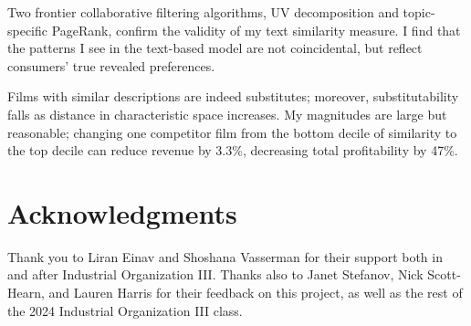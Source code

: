 \documentclass{article}
\begin{document}
Two frontier collaborative filtering algorithms, UV decomposition and topic-specific PageRank, confirm the validity of my text similarity measure. I find that the patterns I see in the text-based model are not coincidental, but reflect consumers' true revealed preferences.

Films with similar descriptions are indeed substitutes; moreover, substitutability falls as distance in characteristic space increases. My magnitudes are large but reasonable; changing one competitor film from the bottom decile of similarity to the top decile can reduce revenue by 3.3\%, decreasing total profitability by 47\%. 

\section*{Acknowledgments}
Thank you to Liran Einav and Shoshana Vasserman for their support both in and after Industrial Organization III. Thanks also to Janet Stefanov, Nick Scott-Hearn, and Lauren Harris for their feedback on this project, as well as the rest of the 2024 Industrial Organization III class.

\printbibliography

\pagebreak
\end{document}

